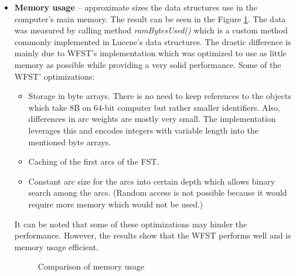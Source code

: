 \begin{itemize}
    \item \textbf{Memory usage} – approximate sizes the data structures use in the computer's main memory.
     The result can be seen in the Figure \ref{comp_mem}. The data was measured by calling method
     \textit{ramBytesUsed()} which is a custom method commonly implemented in Lucene's data structures.
     The drastic
    difference is mainly due to WFST's implementation which was optimized to use as little memory as possible while
    providing a very solid performance. Some of the WFST' optimizations:
    \begin{itemize}
        \item Storage in byte arrays. There is no need to keep references to the objects which take 8B on 64-bit computer
        but rather smaller identifiers. Also, differences in arc weights are mostly very small. The implementation
        leverages this and encodes integers with variable length into the mentioned byte arrays.
        \item Caching of the first arcs of the FST.
        \item Constant arc size for the arcs into certain depth which allows binary search among the arcs. (Random
        access is not possible because it would require more memory which would not be used.)
    \end{itemize}
    It can be noted that some of these optimizations may hinder the performance. However, the results show that the WFST
    performs well and is memory usage efficient.

    \begin{figure}[htbp]
        \centering
        \caption{Comparison of memory usage}
        \label{comp_mem}
    \end{figure}

\end{itemize}

